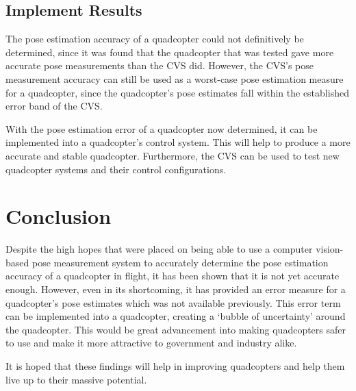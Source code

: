 \subsection{Implement Results}

The pose estimation accuracy of a quadcopter could not definitively be determined, since it was found that the quadcopter that was tested gave more accurate pose measurements than the CVS did. However, the CVS's pose measurement accuracy can still be used as a worst-case pose estimation measure for a quadcopter, since the quadcopter's pose estimates fall within the established error band of the CVS.\@ 

With the pose estimation error of a quadcopter now determined, it can be implemented into a quadcopter's control system. This will help to produce a more accurate and stable quadcopter. Furthermore, the CVS can be used to test new quadcopter systems and their control configurations. 

\section{Conclusion}

Despite the high hopes that were placed on being able to use a computer vision-based pose measurement system to accurately determine the pose estimation accuracy of a quadcopter in flight, it has been shown that it is not yet accurate enough. However, even in its shortcoming, it has provided an error measure for a quadcopter's pose estimates which was not available previously. This error term can be implemented into a quadcopter, creating a `bubble of uncertainty' around the quadcopter. This would be great advancement into making quadcopters safer to use and make it more attractive to government and industry alike. 

It is hoped that these findings will help in improving quadcopters and help them live up to their massive potential. 
